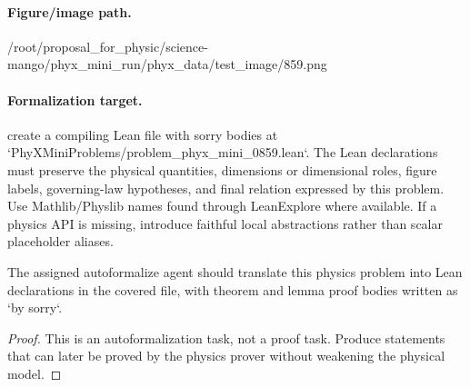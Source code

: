 \paragraph{Figure/image path.}
/root/proposal\_for\_physic/science-mango/phyx\_mini\_run/phyx\_data/test\_image/859.png

\paragraph{Formalization target.}
create a compiling Lean file with sorry bodies at `PhyXMiniProblems/problem\_phyx\_mini\_0859.lean`. The Lean declarations must preserve the physical quantities, dimensions or dimensional roles, figure labels, governing-law hypotheses, and final relation expressed by this problem.
Use Mathlib/Physlib names found through LeanExplore where available. If a physics API is missing, introduce faithful local abstractions rather than scalar placeholder aliases.

\begin{theorem}
\label{thm:physics:phyx_mini_0859:target}
The assigned autoformalize agent should translate this physics problem into Lean declarations in the covered file, with theorem and lemma proof bodies written as `by sorry`.
\end{theorem}
\begin{proof}
This is an autoformalization task, not a proof task. Produce statements that can later be proved by the physics prover without weakening the physical model.
\end{proof}

